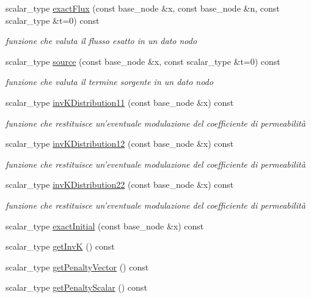 \begin{DoxyCompactItemize}
scalar\-\_\-type \hyperlink{classMediumData_a6f3d3b64009602eb22a7c54b74a33a34}{exact\-Flux} (const base\-\_\-node \&x, const base\-\_\-node \&n, const scalar\-\_\-type \&t=0) const 
\begin{DoxyCompactList}\small\item\em funzione che valuta il flusso esatto in un dato nodo \end{DoxyCompactList}\item 
scalar\-\_\-type \hyperlink{classMediumData_a1f5a2647becdcd8db8ad4c1a9b79b29e}{source} (const base\-\_\-node \&x, const scalar\-\_\-type \&t=0) const 
\begin{DoxyCompactList}\small\item\em funzione che valuta il termine sorgente in un dato nodo \end{DoxyCompactList}\item 
scalar\-\_\-type \hyperlink{classMediumData_aae75c00abbad84594130890eb34dafd9}{inv\-K\-Distribution11} (const base\-\_\-node \&x) const 
\begin{DoxyCompactList}\small\item\em funzione che restituisce un'eventuale modulazione del coefficiente di permeabilità \end{DoxyCompactList}\item 
scalar\-\_\-type \hyperlink{classMediumData_aef29ca88f4183c72f590abffcff1fc87}{inv\-K\-Distribution12} (const base\-\_\-node \&x) const 
\begin{DoxyCompactList}\small\item\em funzione che restituisce un'eventuale modulazione del coefficiente di permeabilità \end{DoxyCompactList}\item 
scalar\-\_\-type \hyperlink{classMediumData_a5298eacbba56d9f3d6bc6b2297cdac31}{inv\-K\-Distribution22} (const base\-\_\-node \&x) const 
\begin{DoxyCompactList}\small\item\em funzione che restituisce un'eventuale modulazione del coefficiente di permeabilità \end{DoxyCompactList}\item 
scalar\-\_\-type \hyperlink{classMediumData_a80235292e1223f4b68a37832f7be9828}{exact\-Initial} (const base\-\_\-node \&x) const 
\item 
scalar\-\_\-type \hyperlink{classMediumData_a72374c5da3834b4313280f5ae53406fb}{get\-Inv\-K} () const 
\item 
scalar\-\_\-type \hyperlink{classMediumData_ac1646aa22f5ed8ea92a14560dfc0905f}{get\-Penalty\-Vector} () const 
\item 
scalar\-\_\-type \hyperlink{classMediumData_a627f26f5f80bb4139a548e2d2cce1a47}{get\-Penalty\-Scalar} () const 
\end{DoxyCompactItemize}


